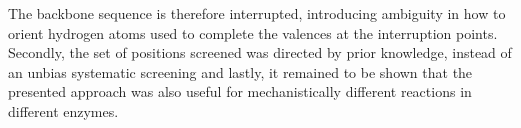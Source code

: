 The backbone sequence is therefore interrupted, introducing ambiguity in how to orient hydrogen atoms used to complete the valences at the interruption points.
Secondly, the set of positions screened was directed by prior knowledge, instead of an unbias systematic screening and lastly, it remained to be shown that the presented approach was also useful for mechanistically different reactions in different enzymes.
%

